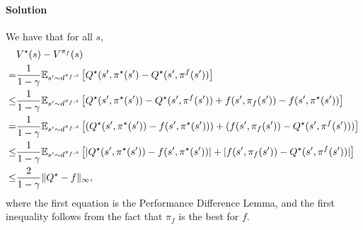 \documentclass{article}
\begin{document}
\paragraph{Solution}
We have that for all $s$, 
\begin{align*}
& V^\star(s) - V^{\pi_f}(s)\\
= & \frac{1}{1-\gamma} \mathbb{E}_{s' \sim d^{\pi_f,s}} \left[Q^\star(s',\pi^\star(s') - Q^\star(s', \pi^f(s'))\right]\\
\leq & \frac{1}{1-\gamma} \mathbb{E}_{s' \sim d^{\pi_f,s}} \left[ Q^\star(s',\pi^\star(s')) - Q^\star(s', \pi^f(s')) + f(s',\pi_f(s')) - f(s', \pi^\star(s'))\right]\\
= & \frac{1}{1-\gamma} \mathbb{E}_{s' \sim d^{\pi_f,s}} \left[ (Q^\star(s',\pi^\star(s')) - f(s', \pi^\star(s'))) + (f(s',\pi_f(s'))- Q^\star(s', \pi^f(s'))) \right]\\
\leq & \frac{1}{1-\gamma} \mathbb{E}_{s' \sim d^{\pi_f,s}} \left[ |Q^\star(s',\pi^\star(s')) - f(s', \pi^\star(s'))| + |f(s',\pi_f(s'))- Q^\star(s', \pi^f(s'))| \right]\\
\leq & \frac{2}{1-\gamma} \|Q^\star - f\|_\infty,
\end{align*}
where the first equation is the Performance Difference Lemma, and the first inequality follows from the fact that $\pi_f$ is the best for $f$.
\end{document}
